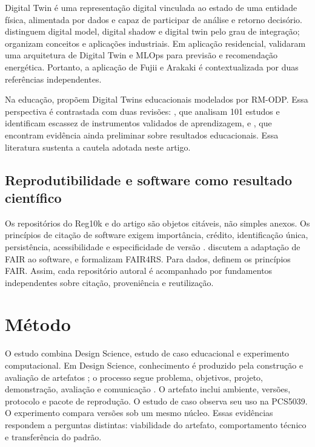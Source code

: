 \documentclass[10pt,a4paper]{article}
\begin{document}
Digital Twin é uma representação digital vinculada ao estado de uma entidade física, alimentada por dados e capaz de participar de análise e retorno decisório. \citet{kritzinger2018} distinguem digital model, digital shadow e digital twin pelo grau de integração; \citet{tao2019} organizam conceitos e aplicações industriais. Em aplicação residencial, \citet{fujii2022} validaram uma arquitetura de Digital Twin e MLOps para previsão e recomendação energética. Portanto, a aplicação de Fujii e Arakaki é contextualizada por duas referências independentes.

Na educação, \citet{brandao2026} propõem Digital Twins educacionais modelados por RM-ODP. Essa perspectiva é contrastada com duas revisões: \citet{harris2026}, que analisam 101 estudos e identificam escassez de instrumentos validados de aprendizagem, e \citet{coombs2026}, que encontram evidência ainda preliminar sobre resultados educacionais. Essa literatura sustenta a cautela adotada neste artigo.

\subsection{Reprodutibilidade e software como resultado científico}

Os repositórios do Reg10k e do artigo são objetos citáveis, não simples anexos. Os princípios de citação de software exigem importância, crédito, identificação única, persistência, acessibilidade e especificidade de versão \citep{smith2016}. \citet{katz2021} discutem a adaptação de FAIR ao software, e \citet{barker2022} formalizam FAIR4RS. Para dados, \citet{wilkinson2016} definem os princípios FAIR. Assim, cada repositório autoral \citep{reg10ksoftware,reg10krepro} é acompanhado por fundamentos independentes sobre citação, proveniência e reutilização.

\section{Método}

O estudo combina Design Science, estudo de caso educacional e experimento computacional. Em Design Science, conhecimento é produzido pela construção e avaliação de artefatos \citep{hevner2004}; o processo segue problema, objetivos, projeto, demonstração, avaliação e comunicação \citep{peffers2007}. O artefato inclui ambiente, versões, protocolo e pacote de reprodução. O estudo de caso observa seu uso na PCS5039. O experimento compara versões sob um mesmo núcleo. Essas evidências respondem a perguntas distintas: viabilidade do artefato, comportamento técnico e transferência do padrão.
\end{document}
